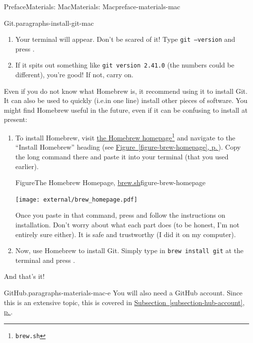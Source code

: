 \documentclass[twoside,10pt,]{book}
\newcommand{\xreffont}{\relax}
\newcommand{\mono}[1]{\texttt{#1}}
\newcommand{\kbd}[1]{\keys{{#1}}}
\begin{document}
\begin{preface}{Preface}{Materials: Mac}{}{Materials: Mac}{}{}{preface-materials-mac}
\begin{paragraphs}{Git.}{paragraphs-install-git-mac}
\begin{enumerate}
\item{}Your terminal will appear. Don't be scared of it! Type \mono{git --version} and press \kbd{Enter}.%
\item{}If it spits out something like \mono{git version 2.41.0} (the numbers could be different), you're good! If not, carry on.%
\end{enumerate}
%
\par
Even if you do not know what Homebrew is, it recommend using it to install Git. It can also be used to quickly (i.e.\@ in one line) install other pieces of software. You might find Homebrew useful in the future, even if it can be confusing to install at present:%
\begin{enumerate}
\item{}To install Homebrew, visit \href{https://brew.sh/}{the Homebrew homepage}\footnote{\nolinkurl{brew.sh}\label{fn-install-git-mac-c-b-a-a-b}} and navigate to the ``Install Homebrew'' heading (see \hyperref[figure-brew-homepage]{Figure~{\xreffont\ref{figure-brew-homepage}}, p.\,\pageref{figure-brew-homepage}}). Copy the long command there and paste it into your terminal (that you used earlier).%
\begin{figureptx}{Figure}{The Homebrew Homepage, \href{https://brew.sh/}{brew.sh}\protect\footnotemark{}}{figure-brew-homepage}{}%
\begin{image}{0.2}{0.6}{0.2}{}%
\texttt{[image: external/brew\_homepage.pdf]}
\end{image}%
\tcblower
\end{figureptx}%
%
Once you paste in that command, press \kbd{Enter} and follow the instructions on installation. Don't worry about what each part does (to be honest, I'm not entirely sure either). It is safe and trustworthy (I did it on my computer).%
\item{}Now, use Homebrew to install Git. Simply type in \mono{brew install git} at the terminal and press \kbd{Enter}.%
\end{enumerate}
And that's it!%
\end{paragraphs}%
\begin{paragraphs}{GitHub.}{paragraphs-materials-mac-e}%
You will also need a GitHub account. Since this is an extensive topic, this is covered in \hyperref[subsection-hub-account]{Subsection~{\xreffont\ref{subsection-hub-account}}, p.\,\pageref{subsection-hub-account}}.%
\end{paragraphs}%
\end{preface}
\end{document}
